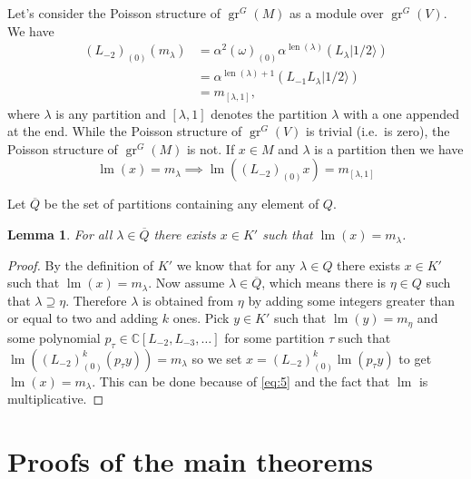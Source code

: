 \documentclass[12pt, a4paper]{article}
\newtheorem{lemma}{Lemma}
\DeclareMathOperator{\gr}{gr}
\DeclareMathOperator{\lm}{lm}
\DeclareMathOperator{\len}{len}
\newcommand{\vachalf}{|1/2\rangle}
\begin{document}
Let's consider the Poisson structure of $\gr^G(M)$ as a module over $\gr^G(V)$.
We have
\begin{align*}
  (L_{-2})_{(0)}(m_\lambda) &= \alpha^2(\omega)_{(0)}\alpha^{\len(\lambda)}(L_\lambda\vachalf) \\
  &= \alpha^{\len(\lambda) + 1}(L_{-1}L_\lambda\vachalf) \\
  &= m_{[\lambda, 1]},
\end{align*}
where $\lambda$ is any partition and $[\lambda, 1]$ denotes the partition $\lambda$ with a one appended at the end.
While the Poisson structure of $\gr^G(V)$ is trivial (i.e.\ is zero), the Poisson structure of $\gr^G(M)$ is not.
If $x \in M$ and $\lambda$ is a partition then we have
\begin{equation}
  \label{eq:5}
  \lm(x) = m_\lambda \implies \lm((L_{-2})_{(0)}x) = m_{[\lambda,1]}
\end{equation}

Let $\overline{Q}$ be the set of partitions containing any element of $Q$.
\begin{lemma}
  \label{lmm:11}
  For all $\lambda \in \overline{Q}$ there exists $x \in K'$ such that $\lm(x) = m_\lambda$.
\end{lemma}

\begin{proof}
  By the definition of $K'$ we know that for any $\lambda \in Q$ there exists $x \in K'$ such that $\lm(x) = m_\lambda$.
  Now assume $\lambda \in \overline{Q}$, which means there is $\eta \in Q$ such that $\lambda \supseteq \eta$.
  Therefore $\lambda$ is obtained from $\eta$ by adding some integers greater than or equal to two and adding $k$ ones.
  Pick $y \in K'$ such that $\lm(y) = m_\eta$ and some polynomial $p_\tau \in \mathbb{C}[L_{-2}, L_{-3}, \dots]$ for some partition $\tau$ such that $\lm((L_{-2})^k_{(0)}(p_\tau y)) = m_\lambda$ so we set $x = (L_{-2})^k_{(0)}\lm(p_\tau y)$ to get $\lm(x) = m_\lambda$.
  This can be done because of \eqref{eq:5} and the fact that $\lm$ is multiplicative.
\end{proof}

\section{Proofs of the main theorems}
\label{sec:proofs-main-theorems}
\end{document}
